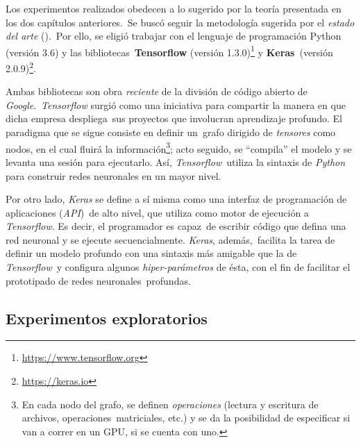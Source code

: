 \noindent
Los experimentos realizados obedecen a lo sugerido por la teoría presentada en los dos capítulos anteriores.\
Se buscó seguir la metodología sugerida por el \emph{estado del arte} (\cite{DBLP:journals/corr/VinyalsTBE16}).\
Por ello, se eligió trabajar con el lenguaje de programación Python (versión 3.6) y las bibliotecas\
\textbf{Tensorflow} (versión 1.3.0)\footnote{\url{https://www.tensorflow.org}} y \textbf{Keras}\
(versión 2.0.9)\footnote{\url{https://keras.io}}.\par
Ambas bibliotecas son obra \emph{reciente} de la división de código abierto de \emph{Google}.\
\emph{Tensorflow} surgió como una iniciativa para compartir la manera en que dicha empresa despliega\
sus proyectos que involucran aprendizaje profundo. El paradigma que se sigue consiste en definir un\
grafo dirigido de \emph{tensores} como nodos, en el cual fluirá la información\footnote{
  En cada nodo del grafo, se definen \emph{operaciones} (lectura y escritura de archivos, operaciones\
  matriciales, etc.) y se da la posibilidad de especificar si van a correr en un GPU, si se cuenta con uno.
}; acto seguido, se ``compila'' el modelo y se levanta una sesión para ejecutarlo. Así, \emph{Tensorflow}\
utiliza la sintaxis de \emph{Python} para construir redes neuronales en un mayor nivel.\par
Por otro lado, \emph{Keras} se define a sí misma como una interfaz de programación de aplicaciones (\emph{API})\
de alto nivel, que utiliza como motor de ejecución a \emph{Tensorflow}. Es decir, el programador es capaz\
de escribir código que defina una red neuronal y se ejecute secuencialmente. \emph{Keras}, además,\
facilita la tarea de definir un modelo profundo con una sintaxis más amigable que la de \emph{Tensorflow}\
y configura algunos \emph{hiper-parámetros} de ésta, con el fin de facilitar el prototipado de redes neuronales\
profundas.

\subsection{Experimentos exploratorios}

